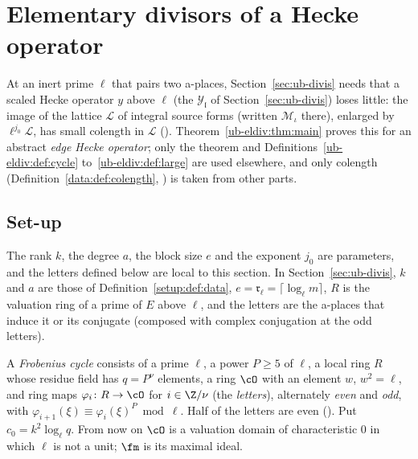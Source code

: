\section{Elementary divisors of a Hecke operator}\label{sec:ub-eldiv}

At an inert prime $\ell$ that pairs two a-places, Section~\ref{sec:ub-divis} needs that a scaled
Hecke operator $y$ above $\ell$ (the $\mathcal Y_{\mathfrak l}$ of Section~\ref{sec:ub-divis}) loses little:
the image of the lattice $\mathcal L$ of integral source forms (written $\mathcal M_\iota$ there),
enlarged by $\ell^{j_0}\mathcal L$, has small colength in $\mathcal L$
(). Theorem~\ref{ub-eldiv:thm:main}
proves this for an abstract \emph{edge Hecke operator}; only the theorem and
Definitions~\ref{ub-eldiv:def:cycle} to~\ref{ub-eldiv:def:large} are used elsewhere, and only colength
(Definition~\ref{data:def:colength}, ) is taken from other parts.

\subsection{Set-up}\label{ub-eldiv:sec:setup}

The rank $k$, the degree $a$, the block size $e$ and the exponent $j_0$ are parameters, and the
letters defined below are local to this section. In Section~\ref{sec:ub-divis}, $k$ and $a$ are
those of Definition~\ref{setup:def:data}, $e=\mathfrak r_\ell=\lceil\log_\ell m\rceil$, $R$ is the valuation ring of a prime of $E$ above
$\ell$, and the letters are the a-places that induce it or its conjugate (composed with complex
conjugation at the odd letters).

\begin{definition}\label{ub-eldiv:def:cycle}
A \emph{Frobenius cycle} consists of a prime $\ell$, a power $P\ge5$ of $\ell$, a local ring $R$ whose
residue field has $q=P^\nu$ elements, a ring $\cO$ with an element $w$, $w^2=\ell$, and ring maps
$\varphi_i\colon R\to\cO$ for $i\in\Z/\nu$ (the \emph{letters}), alternately \emph{even} and
\emph{odd}, with $\varphi_{i+1}(\xi)\equiv\varphi_i(\xi)^P\bmod \ell$. Half of the letters are even
(). Put $c_0=k^2\log_\ell q$. From now on $\cO$ is a
valuation domain of characteristic $0$ in which $\ell$ is not a unit; $\fm$ is its maximal ideal.
\end{definition}

